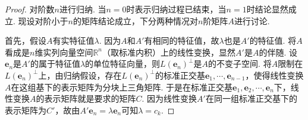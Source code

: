 \documentclass[../../main.tex]{subfiles}
\begin{document}
\begin{proof}
对阶数\(n\)进行归纳. 当\(n = 0\)时表示归纳过程已结束，当\(n = 1\)时结论显然成立. 现设对阶小于\(n\)的矩阵结论成立，下分两种情况对\(n\)阶矩阵\(A\)进行讨论.

首先，假设\(A\)有实特征值\(\lambda\). 因为\(A\)和\(A'\)有相同的特征值，故\(\lambda\)也是\(A'\)的特征值. 将\(A\)看成是\(n\)维实列向量空间\(\mathbb{R}^n\)（取标准内积）上的线性变换，显然\(A'\)是\(A\)的伴随. 设\(\boldsymbol{e}_n\)是\(A'\)的属于特征值\(\lambda\)的单位特征向量，则\(L(\boldsymbol{e}_n)^\perp\)是\(A\)的不变子空间. 将\(A\)限制在\(L(\boldsymbol{e}_n)^\perp\)上，由归纳假设，存在\(L(\boldsymbol{e}_n)^\perp\)的标准正交基\(\boldsymbol{e}_1,\cdots,\boldsymbol{e}_{n - 1}\)，使得线性变换\(A\)在这组基下的表示矩阵为分块上三角矩阵. 于是在标准正交基\(\boldsymbol{e}_1,\boldsymbol{e}_2,\cdots,\boldsymbol{e}_n\)下，线性变换\(A\)的表示矩阵就是要求的矩阵\(C\). 因为线性变换\(A'\)在同一组标准正交基下的表示矩阵为\(C'\)，故由\(A'\boldsymbol{e}_n=\lambda\boldsymbol{e}_n\)可知\(\lambda = c_k\).


\end{proof}
\end{document}
